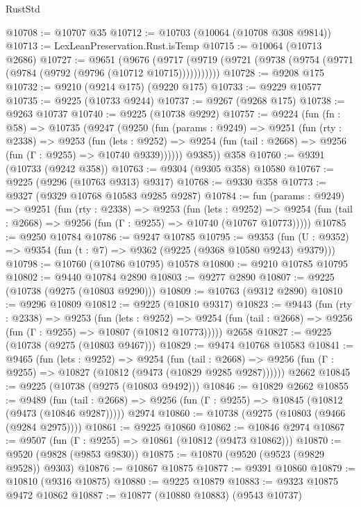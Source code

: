 \begin{lexlean}{RustStd}
\begin{coremodule}
@10708 := @10707 @35
@10712 := @10703 (@10064 (@10708 @308 @9814))
@10713 := LexLeanPreservation.Rust.isTemp
@10715 := @10064 (@10713 @2686)
@10727 := @9651
    (@9676 (@9717 (@9719 (@9721 (@9738 (@9754 (@9771 (@9784 (@9792 (@9796 (@10712 @10715)))))))))))
@10728 := @9208 @175
@10732 := @9210 (@9214 @175) (@9220 @175)
@10733 := @9229 @10577
@10735 := @9225 (@10733 @9244)
@10737 := @9267 (@9268 @175)
@10738 := @9263 @10737
@10740 := @9225 (@10738 @9292)
@10757 := @9224
    (fun (fn : @58) =>
    @10735
      (@9247
        (@9250
          (fun (params : @9249) =>
          @9251
            (fun (rty : @2338) =>
            @9253
              (fun (lets : @9252) =>
              @9254 (fun (tail : @2668) => @9256 (fun (Γ : @9255) => @10740 @9339))))))
        @9385))
    @358
@10760 := @9391 (@10733 (@9242 @358))
@10763 := @9304 (@9305 @358) @10580
@10767 := @9225 (@9296 (@10763 @9313) @9317)
@10768 := @9330 @358
@10773 := @9327 (@9329 @10768 @10583 @9285 @9287)
@10784 := fun (params : @9249) =>
  @9251
    (fun (rty : @2338) =>
    @9253
      (fun (lets : @9252) =>
      @9254 (fun (tail : @2668) => @9256 (fun (Γ : @9255) => @10740 (@10767 @10773)))))
@10785 := @9250 @10784
@10786 := @9247 @10785
@10795 := @9353
    (fun (U : @9352) => @9354 (fun (t : @7) => @9362 (@9225 (@9368 @10580 @9243) @9379)))
@10798 := @10760 (@10786 @10795) @10578
@10800 := @9210 @10785 @10795
@10802 := @9440 @10784 @2890
@10803 := @9277 @2890
@10807 := @9225 (@10738 (@9275 (@10803 @9290)))
@10809 := @10763 (@9312 @2890)
@10810 := @9296 @10809
@10812 := @9225 (@10810 @9317)
@10823 := @9443
    (fun (rty : @2338) =>
    @9253
      (fun (lets : @9252) =>
      @9254 (fun (tail : @2668) => @9256 (fun (Γ : @9255) => @10807 (@10812 @10773)))))
    @2658
@10827 := @9225 (@10738 (@9275 (@10803 @9467)))
@10829 := @9474 @10768 @10583
@10841 := @9465
    (fun (lets : @9252) =>
    @9254
      (fun (tail : @2668) =>
      @9256 (fun (Γ : @9255) => @10827 (@10812 (@9473 (@10829 @9285 @9287))))))
    @2662
@10845 := @9225 (@10738 (@9275 (@10803 @9492)))
@10846 := @10829 @2662
@10855 := @9489
    (fun (tail : @2668) => @9256 (fun (Γ : @9255) => @10845 (@10812 (@9473 (@10846 @9287)))))
    @2974
@10860 := @10738 (@9275 (@10803 (@9466 (@9284 @2975))))
@10861 := @9225 @10860
@10862 := @10846 @2974
@10867 := @9507 (fun (Γ : @9255) => @10861 (@10812 (@9473 @10862)))
@10870 := @9520 (@9828 (@9853 @9830))
@10875 := @10870 (@9520 (@9523 (@9829 @9528)) @9303)
@10876 := @10867 @10875
@10877 := @9391 @10860
@10879 := @10810 (@9316 @10875)
@10880 := @9225 @10879
@10883 := @9323 @10875 @9472 @10862
@10887 := @10877 (@10880 @10883) (@9543 @10737)

\end{coremodule}
\end{lexlean}
